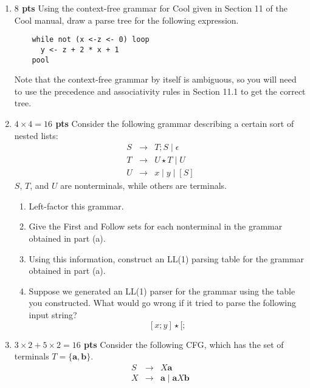 \documentclass[10pt]{article}
\newcommand {\pts}[1]{{\bf #1 pts}}
\begin{document}
\begin{enumerate}
\item \pts{$8$}  Using the context-free grammar for Cool given in Section 11 of the Cool
manual, draw a parse tree for the following expression.
  \begin{lstlisting}
    while not (x <-z <- 0) loop
      y <- z + 2 * x + 1
    pool
  \end{lstlisting}
Note that the context-free grammar by itself is ambiguous, so you will
need to use the precedence and associativity rules in Section 11.1 to
get the correct tree.
             \[
            \]

\newpage
\item \pts{$4\times 4 =16$} Consider the following grammar describing a certain sort of nested lists:
\[\begin{array}{cll}
S & \rightarrow & T;S \mid \epsilon \\
T & \rightarrow & U\star T \mid U \\
U & \rightarrow & x\mid y\mid [S]
\end{array}\]
$S$, $T$, and $U$ are nonterminals, while others are terminals.
\begin{enumerate}
  \item Left-factor this grammar.
               \[
            \]
  \item Give the First and Follow sets for each nonterminal in the grammar obtained in part (a).
               \[
            \]
  \item Using this information, construct an LL(1) parsing table for the grammar obtained in part (a).
               \[
            \]
  \item Suppose we generated an LL(1) parser for the grammar using the table you constructed. What would go wrong if it tried to parse the following input string?
  \[[x;y]\star [;\]
               \[
            \]
\end{enumerate}

\newpage
\item \pts{$3\times 2+5\times 2 =16$} Consider the following CFG, which has the set of terminals
$T = \{ \textbf{a}, \textbf{b} \}$.
\[\begin{array}{cll}
 S & \rightarrow & X \textbf{a} \\
X & \rightarrow & \textbf{a} \mid \textbf{a} X \textbf{b}
\end{array}\]


\end{enumerate}
\end{document}
